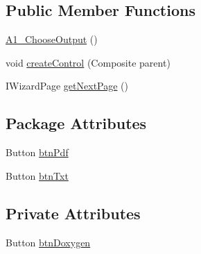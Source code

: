 \subsection*{Public Member Functions}
\begin{DoxyCompactItemize}
\item 
\hyperlink{classit_1_1isislab_1_1masonhelperdocumentation_1_1mason_1_1wizards_1_1_a1___choose_output_a234ef39706fd7044f2213fa13f2ba0c0}{A1\-\_\-\-Choose\-Output} ()
\item 
void \hyperlink{classit_1_1isislab_1_1masonhelperdocumentation_1_1mason_1_1wizards_1_1_a1___choose_output_a817372ddf60178b36c906d2cffca8b12}{create\-Control} (Composite parent)
\item 
I\-Wizard\-Page \hyperlink{classit_1_1isislab_1_1masonhelperdocumentation_1_1mason_1_1wizards_1_1_a1___choose_output_af4b084265832500929ab0f7e60f1b608}{get\-Next\-Page} ()
\end{DoxyCompactItemize}
\subsection*{Package Attributes}
\begin{DoxyCompactItemize}
\item 
Button \hyperlink{classit_1_1isislab_1_1masonhelperdocumentation_1_1mason_1_1wizards_1_1_a1___choose_output_ae7d5e743ab4af65fec8563ca08ed561c}{btn\-Pdf}
\item 
Button \hyperlink{classit_1_1isislab_1_1masonhelperdocumentation_1_1mason_1_1wizards_1_1_a1___choose_output_a4332e3cc38ddfd02242b707d92333cd3}{btn\-Txt}
\end{DoxyCompactItemize}
\subsection*{Private Attributes}
\begin{DoxyCompactItemize}
\item 
Button \hyperlink{classit_1_1isislab_1_1masonhelperdocumentation_1_1mason_1_1wizards_1_1_a1___choose_output_ac2ea8ed088a188d85870e9afb90b8f88}{btn\-Doxygen}
\end{DoxyCompactItemize}


